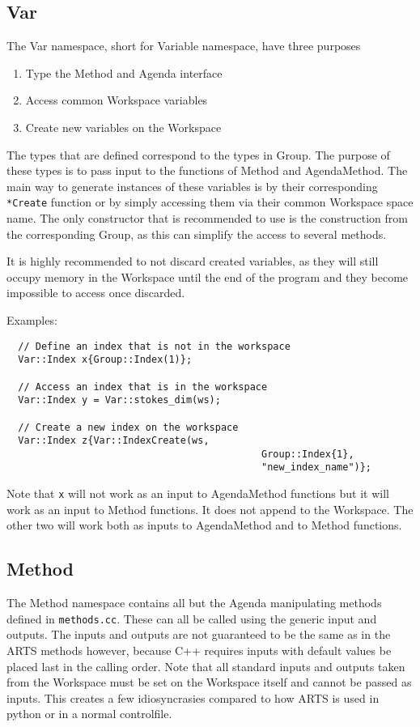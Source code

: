 \subsection{Var}
\label{sec:cpp_api:usage:variable}
The Var namespace, short for Variable namespace, have three purposes
\begin{enumerate}
 \item Type the Method and Agenda interface
 \item Access common Workspace variables
 \item Create new variables on the Workspace
\end{enumerate}
The types that are defined correspond to the types in Group.
The purpose of these types is to pass input to the functions of
Method and AgendaMethod.  The main way to generate
instances of these variables is by their corresponding \verb|*Create|
function or by simply accessing them via their common Workspace
space name.  The only constructor that is recommended to use is the
construction from the corresponding Group, as this can simplify
the access to several methods.

It is highly recommended to not discard created variables, as they
will still occupy memory in the Workspace until the end of the program
and they become impossible to access once discarded.

Examples:
\begin{verbatim}
  // Define an index that is not in the workspace
  Var::Index x{Group::Index(1)};
  
  // Access an index that is in the workspace
  Var::Index y = Var::stokes_dim(ws);
  
  // Create a new index on the workspace
  Var::Index z{Var::IndexCreate(ws,
                                            Group::Index{1},
                                            "new_index_name")};
\end{verbatim}
Note that \verb|x| will not work as an input to AgendaMethod functions
but it will work as an input to Method functions.  It does not append
to the Workspace.  The other two will work both as inputs to
AgendaMethod and to Method functions.

\subsection{Method}
\label{sec:cpp_api:usage:method}
The Method namespace contains all but the Agenda manipulating methods
defined in \verb|methods.cc|.  These can all be called using the generic
input and outputs.  The inputs and outputs are not guaranteed to be the
same as in the ARTS methods however, because C++ requires inputs with 
default values be placed last in the calling order.  Note that all 
standard inputs and outputs taken from the Workspace must be set on the
Workspace itself and cannot be passed as inputs.  This creates a few
idiosyncrasies compared to how ARTS is used in python or in a normal
controlfile.  

